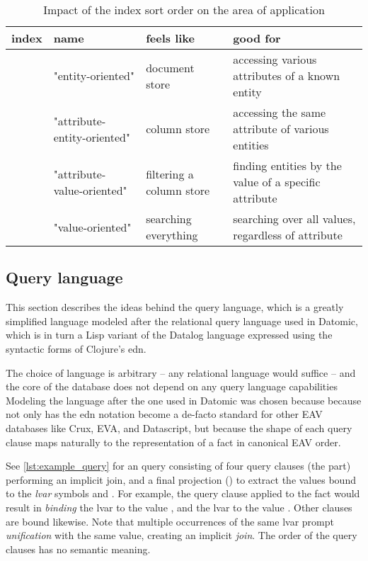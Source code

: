 \begin{table}[]
  \label{tbl:indices}
  \caption{Impact of the index sort order on the area of application}
  \begin{tabularx}{\textwidth}{|l|s|s|X|}
  \hline
  \textbf{index} & \textbf{name}               & \textbf{feels like}      & \textbf{good for}                                     \\ \hline
            & "entity-oriented"           & document store           & accessing various attributes of a known entity        \\ \hline
            & "attribute-entity-oriented" & column store             & accessing the same attribute of various entities      \\ \hline
            & "attribute-value-oriented"  & filtering a column store & finding entities by the value of a specific attribute \\ \hline
            & "value-oriented"            & searching everything     & searching over all values, regardless of attribute    \\ \hline
  \end{tabularx}
\end{table}



\subsection{Query language}

This section describes the ideas behind the query language, which is a greatly simplified language modeled after the relational query language used in Datomic, which is in turn a Lisp variant of the Datalog \cite{abiteboul1988datalog} language expressed using the syntactic forms of Clojure's \gls{edn}.

The choice of language is arbitrary -- any relational language would suffice -- and the core of the database does not depend on any query language capabilities Modeling the language after the one used in Datomic was chosen because because not only has the edn notation become a de-facto standard for other EAV databases like Crux, EVA, and Datascript, but because the shape of each query clause maps naturally to the representation of a fact in canonical EAV order.

See \autoref{lst:example_query} for an query consisting of four query clauses (the  part) performing an implicit join, and a final projection () to extract the values bound to the \emph{\gls{lvar}} symbols  and . For example, the query clause  applied to the fact  would result in \emph{binding} the lvar  to the value , and the lvar  to the value . Other clauses are bound likewise. Note that multiple occurrences of the same lvar prompt \emph{unification} with the same value, creating an implicit \emph{join}. The order of the query clauses has no semantic meaning.


